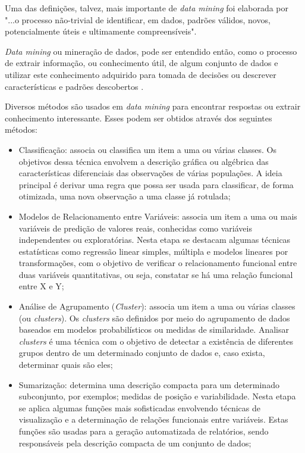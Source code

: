 Uma das definições, talvez, mais importante de \textit{data mining} foi elaborada por  "...o processo não-trivial de identificar, em dados, padrões válidos, novos, potencialmente úteis e ultimamente compreensíveis".

\textit{Data mining} ou mineração de dados, pode ser entendido então, como o processo de extrair informação, ou conhecimento útil, de algum conjunto de dados e utilizar este conhecimento adquirido para tomada de decisões ou descrever características e padrões descobertos \cite{conceito-data-mining}.

Diversos métodos são usados em \textit{data mining} para encontrar respostas ou extrair conhecimento interessante. Esses podem ser obtidos através dos seguintes métodos:

\begin{itemize}
	\item Classificação: associa ou classifica um item a uma ou várias classes. Os objetivos dessa técnica envolvem a descrição gráfica ou algébrica das características diferenciais das observações de várias populações. A ideia principal é derivar uma regra que possa ser usada para classificar, de forma otimizada, uma nova observação a uma classe já rotulada;
	
	\item Modelos de Relacionamento entre Variáveis: associa um item a uma ou mais variáveis de predição de valores reais, conhecidas como variáveis independentes ou exploratórias. Nesta etapa se destacam algumas técnicas estatísticas como regressão linear simples, múltipla e modelos lineares por transformações, com o objetivo de verificar o relacionamento funcional entre duas variáveis quantitativas, ou seja, constatar se há uma relação funcional entre X e Y;
	
	\item Análise de Agrupamento (\textit{Cluster}): associa um item a uma ou várias classes (ou \textit{clusters}). Os \textit{clusters} são definidos por meio do agrupamento de dados baseados em modelos probabilísticos ou medidas de similaridade. Analisar \textit{clusters} é uma técnica com o objetivo de detectar a existência de diferentes grupos dentro de um determinado conjunto de dados e, caso exista, determinar quais são eles;
	
	\item Sumarização: determina uma descrição compacta para um determinado subconjunto, por exemplos; medidas de posição e variabilidade. Nesta etapa se aplica algumas funções mais sofisticadas envolvendo técnicas de visualização e a determinação de relações funcionais entre variáveis. Estas funções são usadas para a geração automatizada de relatórios, sendo responsáveis pela descrição compacta de um conjunto de dados;
	

\end{itemize}
